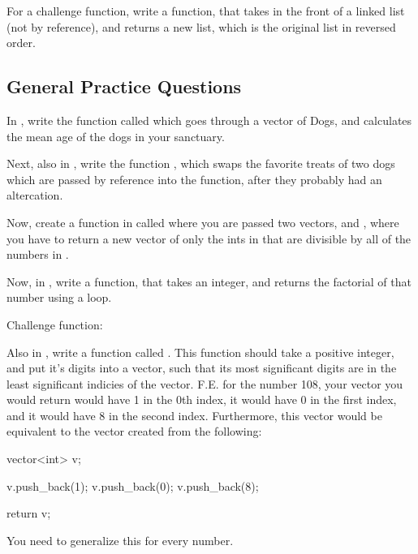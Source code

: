 \documentclass{tufte-handout}
\begin{document}
For a  challenge function, write a function,  that takes in the front of a linked list (not by reference), and returns a new list, which is the original list in reversed order.  

\subsection{General Practice Questions}

In , write the function called  which goes through a vector of Dogs, and calculates the mean age of the dogs in your sanctuary.

Next, also in , write the function , which swaps the favorite treats of two dogs which are passed by reference into the function, after they probably had an altercation.

Now, create a function in  called  where you are passed two vectors,  and , where you have to return a new vector of only the ints in  that are divisible by all of the numbers in .

Now, in , write a function,  that takes an integer, and returns the factorial of that number using a loop.  

Challenge function: 

Also in , write a function called .
This function should take a positive integer, and put it's digits into a vector, such that its most significant digits are in the least significant indicies of the vector.
F.E. for the number 108, your vector you would return would have 1 in the 0th index, it would have 0 in the first index, and it would have 8 in the second index.
Furthermore, this vector would be equivalent to the vector created from the following:
\begin{Code}
vector<int> v;

v.push_back(1);
v.push_back(0);
v.push_back(8);

return v;
\end{Code}
You need to generalize this for every number.
\end{document}
